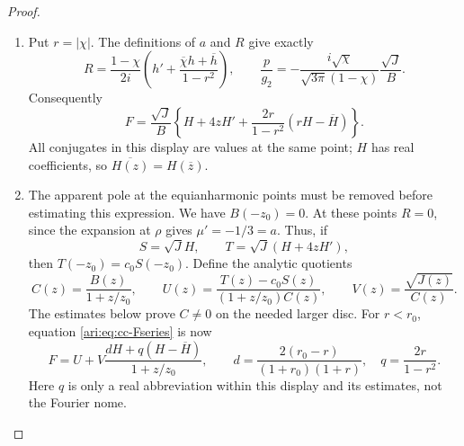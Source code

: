 \begin{proof}
\begin{enumerate}[label=\arabic*.,leftmargin=*]
\item Put $r=|\chi|$. The definitions of $a$ and $R$ give exactly
\[
 R=\frac{1-\chi}{2i}
       \left(h'+\frac{\overline \chi h+\overline h}{1-r^2}\right),
 \qquad
 \frac p{g_2}=-\frac{i\sqrt \chi}{\sqrt{3\pi}(1-\chi)}
                         \frac{\sqrt J}{B}.
\]
Consequently
\begin{equation}\label{ari:eq:cc-Fseries}
 F=\frac{\sqrt J}{B}
 \left\{H+4zH'+\frac{2r}{1-r^2}(rH-\overline H)\right\}.
\end{equation}
All conjugates in this display are values at the same point;
$H$ has real coefficients, so $\overline{H(z)}=H(\overline z)$.

\item The apparent pole at the equianharmonic points must be removed
before estimating this expression. We have $B(-z_0)=0$.
At these points $R=0$, since the expansion at $\rho$ gives
$\mu'=-1/3=a$. Thus, if
\[
 S=\sqrt J H,\qquad T=\sqrt J(H+4zH'),
\]
then $T(-z_0)=c_0S(-z_0)$. Define the analytic quotients
\[
 C(z)=\frac{B(z)}{1+z/z_0},\qquad
 U(z)=\frac{T(z)-c_0S(z)}{(1+z/z_0)C(z)},\qquad
 V(z)=\frac{\sqrt{J(z)}}{C(z)}.
\]
The estimates below prove $C\ne0$ on the needed larger disc.
For $r<r_0$, equation \eqref{ari:eq:cc-Fseries} is now
\begin{equation}\label{ari:eq:cc-Ffactored}
 F=U+V\frac{dH+q(H-\overline H)}{1+z/z_0},
 \qquad
 d=\frac{2(r_0-r)}{(1+r_0)(1+r)},\quad q=\frac{2r}{1-r^2}.
\end{equation}
Here $q$ is only a real abbreviation within this display and
its estimates, not the Fourier nome.


\end{enumerate}
\end{proof}
